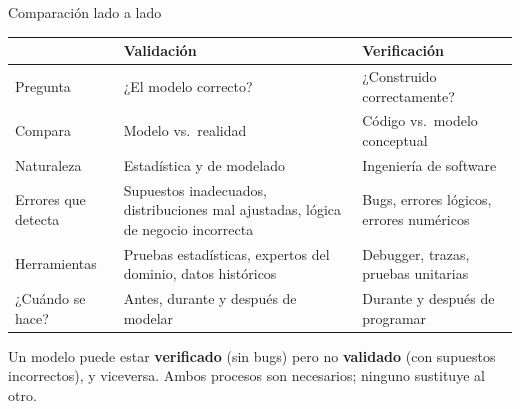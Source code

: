 \documentclass[aspectratio=1610, 10pt]{beamer}
\begin{document}
\begin{frame}{Comparación lado a lado}
  \footnotesize
  \begin{center}
    \renewcommand{\arraystretch}{1.3}
    \begin{tabular}{p{3.6cm}|p{5.1cm}|p{5.1cm}}
      \toprule
      & \textbf{\textcolor{red!70!black}{Validación}}
      & \textbf{\textcolor{mobiblue}{Verificación}} \\
      \midrule
      Pregunta            & ¿El modelo correcto?
                          & ¿Construido correctamente? \\
      \hline
      Compara             & Modelo vs.\ realidad
                          & Código vs.\ modelo conceptual \\
      \hline
      Naturaleza          & Estadística y de modelado
                          & Ingeniería de software \\
      \hline
      Errores que detecta & Supuestos inadecuados, distribuciones mal ajustadas,
                            lógica de negocio incorrecta
                          & Bugs, errores lógicos, errores numéricos \\
      \hline
      Herramientas        & Pruebas estadísticas, expertos del dominio,
                            datos históricos
                          & Debugger, trazas, pruebas unitarias \\
      \hline
      ¿Cuándo se hace?    & Antes, durante y después de modelar
                          & Durante y después de programar \\
      \bottomrule
    \end{tabular}
  \end{center}

  \vspace{6pt}
  \begin{alertabox}[Moraleja]
    \footnotesize
    Un modelo puede estar \textbf{verificado} (sin bugs) pero no
    \textbf{validado} (con supuestos incorrectos), y viceversa. Ambos procesos
    son necesarios; ninguno sustituye al otro.
  \end{alertabox}
\end{frame}
\end{document}
